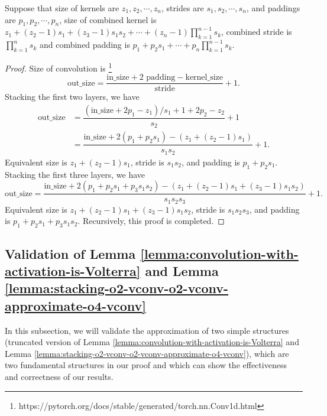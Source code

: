 \documentclass[twoside,11pt]{article}
\begin{document}
\begin{lemma}
  Suppose that size of kernels are \(z_1, z_2, \cdots, z_n\), strides are \(s_1, s_2, \cdots, s_n\), and paddings are \(p_1, p_2, \cdots, p_n\), size of combined kernel is \(z_1 + (z_2 - 1) s_1 + (z_3 - 1) s_1 s_2 + \cdots + (z_n - 1) \prod_{k=1}^{n-1} s_k\), combined stride is \(\prod_{k=1}^{n} s_k\) and combined padding is \(p_1 + p_2 s_1 + \cdots + p_n \prod_{k=1}^{n-1} s_k\).
  \label{lemma:size-of-n-layer-combined-kernel}
\end{lemma}
\begin{proof}
  Size of convolution is \footnote{https://pytorch.org/docs/stable/generated/torch.nn.Conv1d.html}
  \begin{equation*}
    \text{out\_size} = \dfrac{\text{in\_size} + 2 \text{ padding} - \text{kernel\_size}}{\text{stride}} + 1.
  \end{equation*}
  Stacking the first two layers, we have
  \begin{equation*}
    \begin{aligned}
      \text{out\_size}
       & = \dfrac{\left(\text{in\_size} + 2 p_1 - z_1\right)/s_1 + 1 + 2p_2 - z_2}{s_2} + 1  \\
       & = \dfrac{\text{in\_size} + 2 (p_1 + p_2 s_1) - (z_1 + (z_2 - 1) s_1)}{s_1 s_2} + 1.
    \end{aligned}
  \end{equation*}
  Equivalent size is \(z_1 + (z_2 - 1) s_1\), stride is \(s_1 s_2\), and padding is \(p_1 + p_2 s_1\).
  Stacking the first three layers, we have
  \begin{equation*}
    \text{out\_size}
    = \dfrac{\text{in\_size} + 2 (p_1 + p_2 s_1 + p_3 s_1 s_2) - (z_1 + (z_2 - 1) s_1 + (z_3 - 1) s_1 s_2)}{s_1 s_2 s_3} + 1.
  \end{equation*}
  Equivalent size is \(z_1 + (z_2 - 1) s_1 + (z_3 - 1) s_1 s_2\), stride is \(s_1 s_2 s_3\), and padding is \(p_1 + p_2 s_1 + p_3 s_1 s_2\).
  Recursively, this proof is completed.
\end{proof}


\subsection{Validation of Lemma \ref{lemma:convolution-with-activation-is-Volterra}
  and Lemma \ref{lemma:stacking-o2-vconv-o2-vconv-approximate-o4-vconv}}
\label{subsec:validate-gluing-convolutions}

In this subsection, we will validate the approximation of two simple structures (truncated version of Lemma \ref{lemma:convolution-with-activation-is-Volterra} and Lemma \ref{lemma:stacking-o2-vconv-o2-vconv-approximate-o4-vconv}), which are two fundamental structures in our proof and which can show the effectiveness and correctness of our results.
\end{document}

